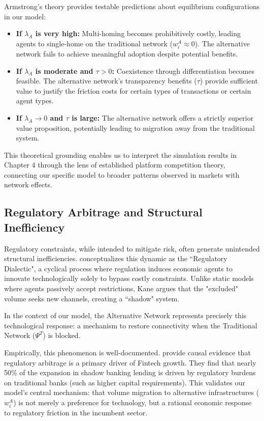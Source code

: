 Armstrong's theory provides testable predictions about equilibrium configurations in our model:

\begin{itemize}
    \item \textbf{If $\lambda_A$ is very high:} Multi-homing becomes prohibitively costly, leading agents to single-home on the traditional network ($w_i^A \approx 0$). The alternative network fails to achieve meaningful adoption despite potential benefits.
    
    \item \textbf{If $\lambda_A$ is moderate and $\tau > 0$:} Coexistence through differentiation becomes feasible. The alternative network's transparency benefits ($\tau$) provide sufficient value to justify the friction costs for certain types of transactions or certain agent types.
    
    \item \textbf{If $\lambda_A \to 0$ and $\tau$ is large:} The alternative network offers a strictly superior value proposition, potentially leading to migration away from the traditional system.
\end{itemize}

This theoretical grounding enables us to interpret the simulation results in Chapter 4 through the lens of established platform competition theory, connecting our specific model to broader patterns observed in markets with network effects.

\subsection{Regulatory Arbitrage and Structural Inefficiency}

Regulatory constraints, while intended to mitigate risk, often generate unintended structural inefficiencies.  conceptualizes this dynamic as the ``Regulatory Dialectic", a cyclical process where regulation induces economic agents to innovate technologically solely to bypass costly constraints. Unlike static models where agents passively accept restrictions, Kane argues that the "excluded" volume seeks new channels, creating a ``shadow" system.

In the context of our model, the Alternative Network represents precisely this technological response: a mechanism to restore connectivity when the Traditional Network ($\Psi^T$) is blocked.

Empirically, this phenomenon is well-documented.  provide causal evidence that regulatory arbitrage is a primary driver of Fintech growth. They find that nearly 50\% of the expansion in shadow banking lending is driven by regulatory burdens on traditional banks (such as higher capital requirements). This validates our model's central mechanism: that volume migration to alternative infrastructures ($w_i^A$) is not merely a preference for technology, but a rational economic response to regulatory friction in the incumbent sector.

